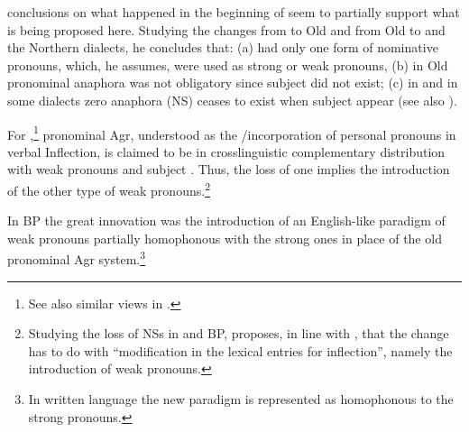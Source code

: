 \documentclass[output=paper]{langsci/langscibook}
\begin{document}
\ea\label{tree:fig2}
\z

 conclusions on what happened in the beginning of 
seem to partially support what is being proposed here. Studying the changes
from  to Old  and from Old  to  and the Northern
 dialects, he concludes that: (a)  had only one form of
nominative pronouns, which, he assumes, were used as strong or weak pronouns,
(b) in Old  pronominal anaphora was not obligatory since subject 
did not exist; (c) in  and in some  dialects zero
anaphora  (NS) ceases to exist when subject  appear (see also
\citealt{Roberts1993}).

For \citet{Kato1999},\footnote{See also similar views in
\citet{Barbosa1995,AleAna1998,OrdonezTrevino1999}.} pronominal Agr, understood
as the /in\-cor\-poration of personal pronouns in verbal
Inflection, is claimed to be in crosslinguistic complementary distribution with
weak pronouns and subject . Thus, the loss of one implies the
introduction of the other type of weak pronouns.\footnote{Studying the loss of
    NSs in  and \gls{BP},
\textcite[28]{Camacho2016} proposes, in line with \citet{Kato1999}, that the
change has to do with “modification in the lexical entries for inflection”,
namely the introduction of weak pronouns.}

In \gls{BP} the great innovation was the introduction
of an English-like paradigm of weak pronouns partially homophonous with the
strong ones \parencite{Nunes1990,Kato1999} in place of the old pronominal Agr
system.\footnote{In written language the new paradigm is represented as
homophonous to the strong pronouns.}
\end{document}
